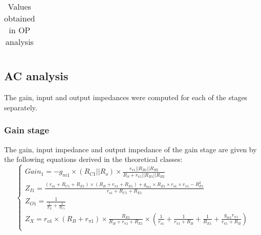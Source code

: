 \begin{table}[H]
  \centering
  \begin{tabular}{|c|c|}
    \hline
      
  \end{tabular}
  \caption{Values obtained in OP analysis}
  \label{tab:resultsDC2}
\end{table}





\subsection{AC analysis}
The gain, input and output impedances were computed for each of the stages separately.

\subsubsection{Gain stage}
The gain, input impedance and output impedance of the gain stage are given by the following equations derived in the theoretical classes:
\begin{equation}
\begin{cases}
Gain_1 = -g_{m1} \times (R_{C1} || R_{o}) \times \frac{r_{\pi1} || R_{B1} || R_{B2}}{R_S+r_{\pi1} || R_{B1} || R_{B2}}\\
Z_{I1} = \frac{(r_{o1}+R_{C1}+R_{E1}) \times (R_B+r_{\pi 1}+R_{E1}) + g_{m1} \times R_{E1} \times r_{o1} \times r_{\pi 1} - R_{E1}^2}{r_{o1} + R_{C1} + R_{E1}} \\
Z_{O1} = \frac{1}{\frac{1}{Z_X}+\frac{1}{R_{C1}}} \\
Z_X = r_{o1} \times (R_B+r_{\pi 1}) \times \frac{R_{E1}}{R_B+r_{\pi 1}+R_{E1}} \times (\frac{1}{r_{o1}}+\frac{1}{r_{\pi 1}+R_B}+\frac{1}{R_{E1}}+  \frac{g_{m1} r_{\pi 1}}{r_{\pi 1}+R_B}) \\
\end{cases}
\end{equation}

